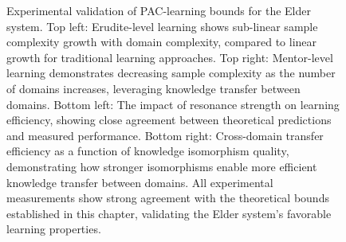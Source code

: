 \begin{figure}[t]
\caption{Experimental validation of PAC-learning bounds for the Elder system. Top left: Erudite-level learning shows sub-linear sample complexity growth with domain complexity, compared to linear growth for traditional learning approaches. Top right: Mentor-level learning demonstrates decreasing sample complexity as the number of domains increases, leveraging knowledge transfer between domains. Bottom left: The impact of resonance strength on learning efficiency, showing close agreement between theoretical predictions and measured performance. Bottom right: Cross-domain transfer efficiency as a function of knowledge isomorphism quality, demonstrating how stronger isomorphisms enable more efficient knowledge transfer between domains. All experimental measurements show strong agreement with the theoretical bounds established in this chapter, validating the Elder system's favorable learning properties.}
\label{fig:pac_experimental}
\end{figure}